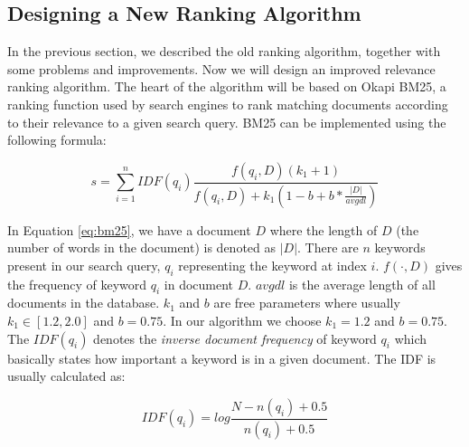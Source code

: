 \subsection{Designing a New Ranking Algorithm}
In the previous section, we described the old ranking algorithm, together with some problems and improvements. Now we will design an improved relevance ranking algorithm. The heart of the algorithm will be based on Okapi BM25, a ranking function used by search engines to rank matching documents according to their relevance to a given search query\cite{jones2000probabilistic}. BM25 can be implemented using the following formula:

\begin{equation}
\label{eq:bm25}
s = \sum_{i=1}^{n} IDF(q_i) \frac{f(q_i, D)(k_1 + 1)}{f(q_i, D) + k_1 (1 - b + b * \frac{|D|}{avgdl})}
\end{equation}

\noindent In Equation \ref{eq:bm25}, we have a document $ D $ where the length of $ D $ (the number of words in the document) is denoted as $ |D| $. There are $ n $ keywords present in our search query, $ q_i $ representing the keyword at index $ i $. $ f(\cdot, D) $ gives the frequency of keyword $ q_i $ in document $ D $. $ avgdl $ is the average length of all documents in the database. $ k_1 $ and $ b $ are free parameters where usually $ k_1  \in [1.2,2.0] $ and $ b = 0.75 $. In our algorithm we choose $ k_1 = 1.2 $ and $ b = 0.75 $. The $ IDF(q_i) $ denotes the \emph{inverse document frequency} of keyword $ q_i $ which basically states how important a keyword is in a given document. The IDF is usually calculated as:

\begin{equation}
\label{eq:bm25-idf}
IDF(q_i) = log\frac{N - n(q_i) + 0.5}{n(q_i) + 0.5}
\end{equation}

